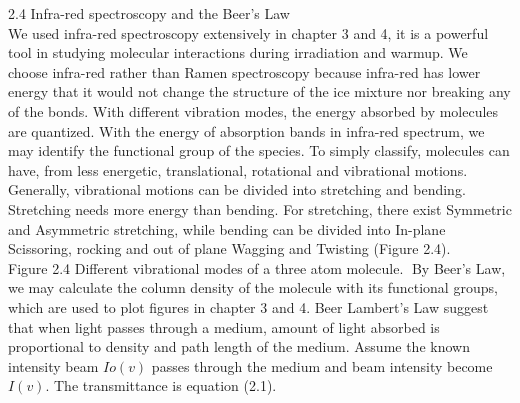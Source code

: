 2.4 Infra-red spectroscopy and the Beer’s Law\\
We used infra-red spectroscopy extensively in chapter 3 and 4, it is a powerful tool in studying molecular interactions during irradiation and warmup. We choose infra-red rather than Ramen spectroscopy because infra-red has lower energy that it would not change the structure of the ice mixture nor breaking any of the bonds. With different vibration modes, the energy absorbed by molecules are quantized. With the energy of absorption bands in infra-red spectrum, we may identify the functional group of the species. To simply classify, molecules can have, from less energetic, translational, rotational and vibrational motions. Generally, vibrational motions can be divided into stretching and bending. Stretching needs more energy than bending. For stretching, there exist Symmetric and Asymmetric stretching, while bending can be divided into In-plane Scissoring, rocking and out of plane Wagging and Twisting (Figure 2.4).\\

Figure 2.4 Different vibrational modes of a three atom molecule.
By Beer’s Law, we may calculate the column density of the molecule with its functional groups, which are used to plot figures in chapter 3 and 4. Beer Lambert’s Law suggest that when light passes through a medium, amount of light absorbed is proportional to density and path length of the medium. Assume the known intensity beam $Io(v)$ passes through the medium and beam intensity become $I(v)$. The transmittance is equation (2.1).
\\





